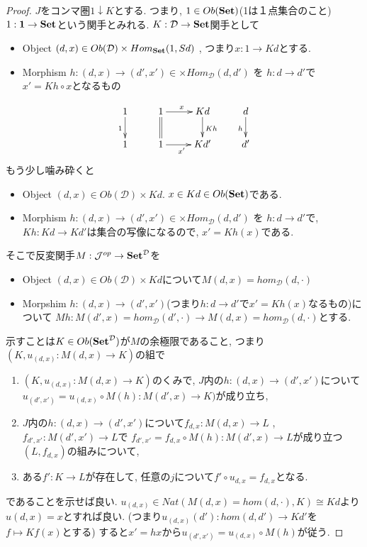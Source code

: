 \documentclass[dvipdfmx,a4paper,11pt]{report}
\theoremstyle{definition}
\begin{document}
\begin{proof}
$J$をコンマ圏$1 \downarrow K$とする.
つまり,
$1 \in Ob({\bf Set})$(1は１点集合のこと)
$1 :  {\bf 1} \to {\bf Set}$という関手とみれる. 
$K : \mathcal{D} \to {\bf Set}$関手として
\begin{itemize}
\item Object $(d,x) \in Ob(\mathcal{D}) \times Hom_{{\bf Set}}(1, Sd)$ , つまり$x : 1 \to Kd$とする. 
\item Morphism $h : (d,x)  \to (d',x') \in \times Hom_{\mathcal{D}}(d,d') $ を 
$h: d \to d'$で$x'  = Kh \circ x$となるもの
\end{itemize}

\begin{equation*}
\xymatrix@C=25pt@R=20pt{
1 \ar@{->}[d] _{1}&1\ar@{=}[d] \ar@{->}[r]^{x} & Kd\ar@{->}[d]^{Kh} &d\ar@{->}[d]_{h}\\
1&1\ar@{->}[r]_{x'} &Kd'&d' \\   
}
\end{equation*}
もう少し噛み砕くと
\begin{itemize}
\item Object $(d,x) \in Ob(\mathcal{D}) \times Kd$. $x \in Kd \in Ob({\bf Set})$である.
\item Morphism $h : (d,x)  \to (d',x') \in \times Hom_{\mathcal{D}}(d,d')$ を
$h: d \to d'$で, $Kh : Kd \to Kd'$は集合の写像になるので, $x' = Kh(x)$である. 
\end{itemize}

そこで反変関手$M : \mathcal{J}^{op} \to {\bf Set }^{\mathcal{D}}$を
\begin{itemize}
\item Object $(d,x) \in Ob(\mathcal{D}) \times Kd$について$M(d,x) = hom_{\mathcal{D}}(d, \cdot)$
\item Morpshim $h : (d,x)  \to (d',x') $(つまり$h : d \to d'$で$x' = Kh(x)$なるもの)について
$Mh :  M(d',x) = hom_{\mathcal{D}}(d', \cdot) \to  M(d,x) = hom_{\mathcal{D}}(d, \cdot) $とする.
\end{itemize}

示すことは$K \in Ob({\bf Set}^{\mathcal{D}})$が$M$の余極限であること, 
つまり
$(K, u_{(d,x)}: M(d,x) \to K)$の組で
\begin{enumerate}
\item $(K, u_{(d,x)}: M(d,x) \to K)$のくみで, $J$内の$h : (d,x)\to (d',x')$について$u_{(d',x')}  = u_{(d,x)} \circ M(h) : M(d',x) \to K)$が成り立ち, 
\item $J$内の$h : (d,x)\to (d',x')$について$f_{d,x} : M(d,x) \to L$
, $f_{d',x'} : M(d',x') \to L$で
$f_{d',x'}  = f_{d,x}\circ M(h) : M(d',x) \to L$が成り立つ$(L, f_{d,x})$の組みについて,
\item ある$f' : K \to L$が存在して, 任意の$j$について$f' \circ u_{d,x} = f_{d,x}$となる.
\end{enumerate}
であることを示せば良い.
$u_{(d,x)} \in  Nat(M(d,x)=hom(d, \cdot) ,  K ) \cong Kd$より$u{(d,x)} = x$とすれば良い. 
(つまり$u_{(d,x)}(d') : hom(d, d') \to  Kd'$を$f \mapsto Kf(x)$とする)
すると$x' =hx$から$u_{(d',x')}  = u_{(d,x)} \circ M(h)$が従う.


\end{proof}
\end{document}
